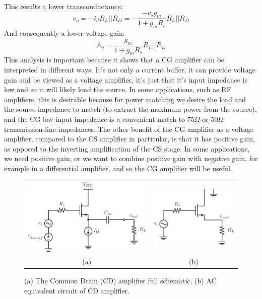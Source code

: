 This results a lower transconductance:
    \begin{equation}
        v_{o} = - i_d R_L||R_D =  - \frac{-v_s g_m }{1 + g_m R_s} R_L||R_D 
    \end{equation}
And consequently a lower voltage gain: 
    \begin{equation}
        A_v = \frac{g_m }{1 + g_m R_s} R_L||R_D
    \end{equation}
This analysis is important because it shows that a CG amplifier can be interpreted in different ways.  It's not only a current buffer, it can provide voltage gain and be viewed as a voltage amplifier, it's just that it's input impedance is low and so it will likely load the source.  In some applications, such as RF amplifiers, this is desirable because for power matching we desire the load and the source impedance to match (to extract the maximum power from the source), and the CG low input impedance is a convenient match to $75\Omega$ or $50\Omega$ transmission-line impedances.  The other benefit of the CG amplifier as a voltage amplifier, compared to the CS amplifier in particular, is that it has positive gain, as opposed to the inverting amplification of the CS stage.  In some applications, we need positive gain, or we want to combine positive gain with negative gain, for example in a differential amplifier, and so the CG amplifier will be useful.
\begin{figure}[tb]
\centering
\begin{tabular}{cc}
\includegraphics[scale=.9]{cd_amp_dc} &
\includegraphics[scale=.9]{cd_amp_ac}\\
(a) & (b)\\
\end{tabular}
\caption{(a) The Common Drain (CD) amplifier full schematic.  (b) AC equivalent circuit of CD amplifier.}
\label{fig:cd_amp_dc_ac}
\end{figure}
